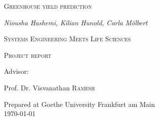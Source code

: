 \documentclass[12pt]{article}
\begin{document}
\setlength\parindent{0pt}
\begin{titlepage}
	\centering
	\vspace{5cm}
	{\scshape\LARGE Greenhouse yield prediction \par}
	\vspace{2cm}
	{\Large\itshape Niousha Hashemi, Kilian Hunold, Carla Mölbert\par}
	{\scshape Systems Engineering Meets Life Sciences \par}
	{\scshape Project report\par}
	
	\vfill
	Advisor:\par
	Prof. Dr. Visvanathan  \textsc{Ramesh} 
	
	\vfill
	
	{\large Prepared at Goethe University Frankfurt am Main \\ \today\par}
\end{titlepage}

\tableofcontents \newpage 





%
%
\end{document}
